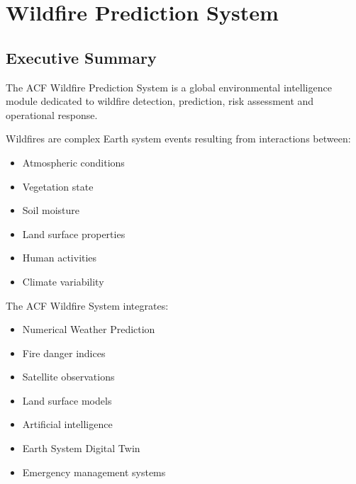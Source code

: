 
\section{Wildfire Prediction System}

\subsection{Executive Summary}

The ACF Wildfire Prediction System is a global environmental intelligence
module dedicated to wildfire detection, prediction, risk assessment and
operational response.

Wildfires are complex Earth system events resulting from interactions
between:

\begin{itemize}

\item Atmospheric conditions

\item Vegetation state

\item Soil moisture

\item Land surface properties

\item Human activities

\item Climate variability

\end{itemize}


The ACF Wildfire System integrates:

\begin{itemize}

\item Numerical Weather Prediction

\item Fire danger indices

\item Satellite observations

\item Land surface models

\item Artificial intelligence

\item Earth System Digital Twin

\item Emergency management systems

\end{itemize}


